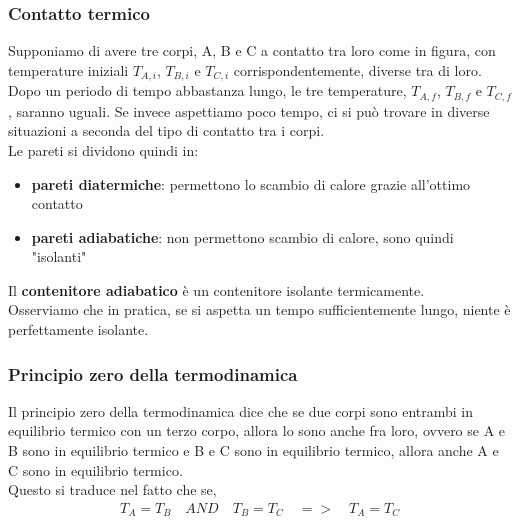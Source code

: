         \subsubsection{Contatto termico}
            Supponiamo di avere tre corpi, A, B e C a contatto tra loro come in figura, con temperature iniziali $T_{A,i}$, $T_{B,i}$ e $T_{C,i}$ corrispondentemente, diverse tra di loro.\\
            Dopo un periodo di tempo abbastanza lungo, le tre temperature, $T_{A,f}$, $T_{B,f}$ e $T_{C,f}$, saranno uguali. Se invece aspettiamo poco tempo, ci si può trovare in diverse situazioni a seconda del tipo di contatto tra i corpi.\\
            Le pareti si dividono quindi in:
            \begin{itemize}
                \item \textbf{pareti diatermiche}: permettono lo scambio di calore grazie all'ottimo contatto\\
                \item \textbf{pareti adiabatiche}: non permettono scambio di calore, sono quindi "isolanti"
            \end{itemize}
            Il \textbf{contenitore adiabatico} è un contenitore isolante termicamente.\\
            Osserviamo che in pratica, se si aspetta un tempo sufficientemente lungo, niente è perfettamente isolante.

        \subsubsection{Principio zero della termodinamica}
            Il principio zero della termodinamica dice che se due corpi sono entrambi in equilibrio termico con un terzo corpo, allora lo sono anche fra loro, ovvero se A e B sono in equilibrio termico e B e C sono in equilibrio termico, allora anche A e C sono in equilibrio termico.\\
            Questo si traduce nel fatto che se,
            \begin{align*}
                T_A=T_B\quad AND\quad T_B=T_C\quad =>\quad T_A=T_C
            \end{align*}

